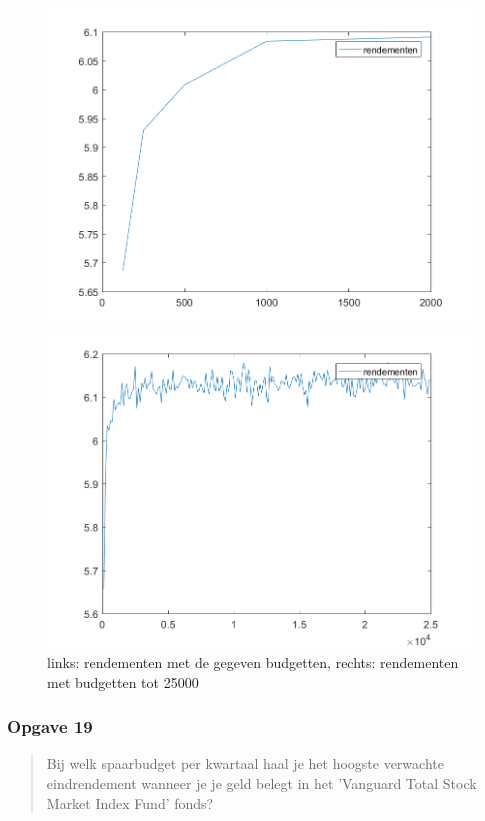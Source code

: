 \documentclass[11pt, a4paper, titlepage, openright]{article}
\begin{document}
		\begin{figure}[H]
		\begin{minipage}[b]{0.49\textwidth}
		\includegraphics[width=1.0\linewidth]{../ex18}
		\end{minipage}
		\hfill
		\begin{minipage}[b]{0.49\textwidth}
		\includegraphics[width=1\linewidth]{../ex18-veel-budgetten}
		\end{minipage}
		\caption{links: rendementen met de gegeven budgetten, rechts: rendementen met budgetten tot 25000}
		\label{fig:ex18}
		\end{figure}
		
	\subsubsection{Opgave 19}
		\begin{quote}
			Bij welk spaarbudget per kwartaal haal je het hoogste verwachte eindrendement wanneer je je geld belegt in het 
			'Vanguard Total Stock Market Index Fund' fonds?
		\end{quote}
		
\end{document}
